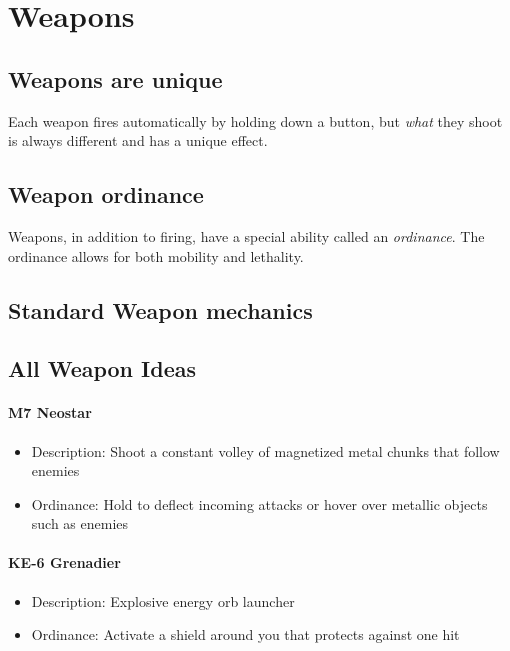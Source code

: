 \documentclass[../Main.tex]{subfiles}
\begin{document}
\section{Weapons}


\subsection{Weapons are unique}

Each weapon fires automatically by holding down a button, but \emph{what} they shoot is always different and has a unique  effect. 

\subsection{Weapon ordinance}

Weapons, in addition to firing, have a special ability called an \emph{ordinance}. The ordinance allows for both mobility and lethality.

\subsection{Standard Weapon mechanics}


\subsection{All Weapon Ideas}

\paragraph{M7 Neostar}

\begin{itemize}
	\item Description: Shoot a constant volley of magnetized metal chunks that follow enemies
	\item Ordinance: Hold to deflect incoming attacks or hover over metallic objects such as enemies
\end{itemize} 


\paragraph{KE-6 Grenadier}
 
\begin{itemize}
	\item Description: Explosive energy orb launcher
	\item Ordinance: Activate a shield around you that protects against one hit
\end{itemize} 
\end{document}
